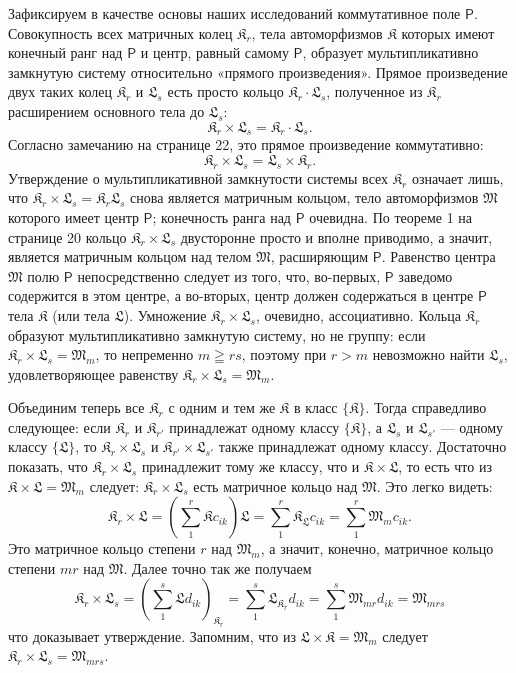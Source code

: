 \documentclass[11pt]{article}
\begin{document}
Зафиксируем в качестве основы наших исследований коммутативное поле \(\mathsf P\). Совокупность всех матричных колец \(\mathfrak K_r\), тела автоморфизмов \(\mathfrak K\) которых имеют конечный ранг над \(\mathsf P\) и центр, равный самому \(\mathsf P\), образует мультипликативно замкнутую систему относительно «прямого произведения». Прямое произведение двух таких колец \(\mathfrak K_r\) и \(\mathfrak L_s\) есть просто кольцо \(\mathfrak K_r\cdot\mathfrak L_s\), полученное из \(\mathfrak K_r\) расширением основного тела до \(\mathfrak L_s\):
\[
\mathfrak K_r\times\mathfrak L_s=\mathfrak K_r\cdot\mathfrak L_s.
\]
Согласно замечанию на странице 22, это прямое произведение коммутативно:
\[
\mathfrak K_r\times\mathfrak L_s=\mathfrak L_s\times\mathfrak K_r.
\]
Утверждение о мультипликативной замкнутости системы всех \(\mathfrak K_r\) означает лишь, что \(\mathfrak K_r\times\mathfrak L_s=\mathfrak K_r\mathfrak L_s\) снова является матричным кольцом, тело автоморфизмов \(\mathfrak M\) которого имеет центр \(\mathsf P\); конечность ранга над \(\mathsf P\) очевидна. По теореме 1 на странице 20 кольцо \(\mathfrak K_r\times\mathfrak L_s\) двусторонне просто и вполне приводимо, а значит, является матричным кольцом над телом \(\mathfrak M\), расширяющим \(\mathsf P\). Равенство центра \(\mathfrak M\) полю \(\mathsf P\) непосредственно следует из того, что, во-первых, \(\mathsf P\) заведомо содержится в этом центре, а во-вторых, центр должен содержаться в центре \(\mathsf P\) тела \(\mathfrak K\) (или тела \(\mathfrak L\)). Умножение \(\mathfrak K_r\times\mathfrak L_s\), очевидно, ассоциативно. Кольца \(\mathfrak K_r\) образуют мультипликативно замкнутую систему, но не группу: если \(\mathfrak K_r\times\mathfrak L_s=\mathfrak M_m\), то непременно \(m\geqq rs\), поэтому при \(r>m\) невозможно найти \(\mathfrak L_s\), удовлетворяющее равенству \(\mathfrak K_r\times\mathfrak L_s=\mathfrak M_m\).

Объединим теперь все \(\mathfrak K_r\) с одним и тем же \(\mathfrak K\) в класс \(\{\mathfrak K\}\). Тогда справедливо следующее: если \(\mathfrak K_r\) и \(\mathfrak K_{r'}\) принадлежат одному классу \(\{\mathfrak K\}\), а \(\mathfrak L_s\) и \(\mathfrak L_{s'}\) --- одному классу \(\{\mathfrak L\}\), то \(\mathfrak K_r\times\mathfrak L_s\) и \(\mathfrak K_{r'}\times\mathfrak L_{s'}\) также принадлежат одному классу. Достаточно показать, что \(\mathfrak K_r\times\mathfrak L_s\) принадлежит тому же классу, что и \(\mathfrak K\times\mathfrak L\), то есть что из \(\mathfrak K\times\mathfrak L=\mathfrak M_m\) следует: \(\mathfrak K_r\times\mathfrak L_s\) есть матричное кольцо над \(\mathfrak M\). Это легко видеть:
\[
\mathfrak K_r\times\mathfrak L
=\left(\sum_1^r\mathfrak K c_{ik}\right)\mathfrak L
=\sum_1^r\mathfrak K_{\mathfrak L}c_{ik}
=\sum_1^r\mathfrak M_m c_{ik}.
\]
Это матричное кольцо степени \(r\) над \(\mathfrak M_m\), а значит, конечно, матричное кольцо степени \(mr\) над \(\mathfrak M\). Далее точно так же получаем
\[
\mathfrak K_r\times\mathfrak L_s
=\left(\sum_1^s\mathfrak L d_{ik}\right)_{\mathfrak K_r}
=\sum_1^s\mathfrak L_{\mathfrak K_r}d_{ik}
=\sum_1^s\mathfrak M_{mr}d_{ik}
=\mathfrak M_{mrs}
\]
что доказывает утверждение. Запомним, что из \(\mathfrak L\times\mathfrak K=\mathfrak M_m\) следует \(\mathfrak K_r\times\mathfrak L_s=\mathfrak M_{mrs}\).
\end{document}
